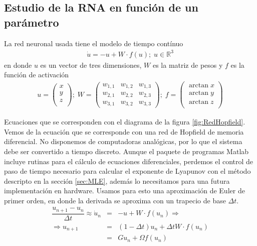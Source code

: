 \subsection{Estudio de la RNA en función de un parámetro}

La red neuronal usada tiene el modelo de tiempo contínuo
\begin{eqnarray}\label{eq:ModTiempCont}
\dot{u} = -u + W \cdot f(u); \; u \in \mathbb{R}^3
\end{eqnarray}
en donde $u$ es un vector de tres dimensiones, $W$ es la matriz de pesos y $f$ es la función de activación
\begin{eqnarray}\label{eq:uWf}
u =
\left( \begin{array}{c}
x\\
y\\
z\\
\end{array} \right)
; \;
W =
\left( \begin{array}{ccc}
w_{1,1} & w_{1,2} & w_{1,3}\\
w_{2,1} & w_{2,2} & w_{2,3}\\
w_{3,1} & w_{3,2} & w_{3,3}
\end{array} \right)
; \;
f =
\left( \begin{array}{c}
\arctan x\\
\arctan y\\
\arctan z\\
\end{array} \right)
\end{eqnarray}

Ecuaciones que se corresponden con el diagrama de la figura \ref{fig:RedHopfield}.
Vemos de la ecuación que se corresponde con una red de Hopfield de memoria diferencial.
No disponemos de computadoras analógicas, por lo que el sistema debe ser convertido a tiempo discreto.
Aunque el paquete de programas Matlab incluye rutinas para el cálculo de ecuaciones diferenciales, perdemos el control de paso de tiempo necesario para calcular el exponente de Lyapunov con el método descripto en la sección \ref{sec:MLE}, además lo necesitamos para una futura implementación en hardware.
Usamos para esto una aproximación de Euler de primer orden, en donde la derivada se aproxima con un trapecio de base $\Delta t$.
%
\begin{eqnarray}\label{eq:EulerRNA}
	\dfrac{u_{n+1}-u_n}{\Delta t} \approx \dot{u}_n &=& -u + W \cdot f(u_n) \Rightarrow\\ \nonumber
	\Rightarrow u_{n+1} &=& (1 - \Delta t)u_n + \Delta t W \cdot f(u_n)\\ \nonumber
						 &=& Gu_n + \Omega f(u_n)
\end{eqnarray}


